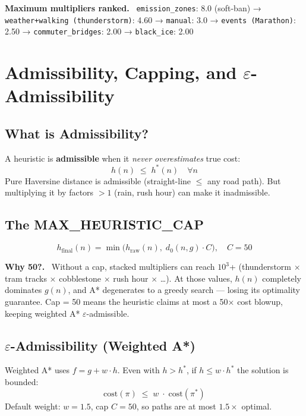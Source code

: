 \documentclass[11pt,a4paper]{article}
\newenvironment{notebox}[1][Note]{%
  \begin{mdframed}[backgroundcolor=notebox,linecolor=blue!40,linewidth=1pt]%
  \textbf{#1.}\ }{\end{mdframed}}
\newenvironment{warnbox}[1][Key Point]{%
  \begin{mdframed}[backgroundcolor=warnbox,linecolor=orange!60,linewidth=1pt]%
  \textbf{#1.}\ }{\end{mdframed}}
\begin{document}
\begin{warnbox}[Maximum multipliers ranked]
\texttt{emission\_zones}: 8.0 (soft-ban) → \texttt{weather+walking (thunderstorm)}: 4.60 → \texttt{manual}: 3.0 → \texttt{events (Marathon)}: 2.50 → \texttt{commuter\_bridges}: 2.00 → \texttt{black\_ice}: 2.00
\end{warnbox}

\section{Admissibility, Capping, and $\varepsilon$-Admissibility}

\subsection{What is Admissibility?}
A heuristic is \textbf{admissible} when it \textit{never overestimates} true cost:
\[
h(n) \;\le\; h^*(n) \quad \forall n
\]
Pure Haversine distance is admissible (straight-line $\le$ any road path). But multiplying it by
factors $>1$ (rain, rush hour) can make it inadmissible.

\subsection{The MAX\_HEURISTIC\_CAP}
\[
h_{\text{final}}(n) = \min\!\bigl(h_{\text{raw}}(n),\; d_0(n,g)\cdot C\bigr), \quad C = 50
\]

\begin{notebox}[Why 50?]
Without a cap, stacked multipliers can reach $10^3$+ (thunderstorm $\times$ tram tracks $\times$ cobblestone $\times$ rush hour $\times$ \ldots). At those values, $h(n)$ completely dominates $g(n)$, and A* degenerates to a greedy search — losing its optimality guarantee. Cap = 50 means the heuristic claims at most a 50× cost blowup, keeping weighted A* $\varepsilon$-admissible.
\end{notebox}

\subsection{$\varepsilon$-Admissibility (Weighted A*)}
Weighted A* uses $f = g + w\cdot h$. Even with $h > h^*$, if $h \le w\cdot h^*$ the solution is bounded:
\[
\text{cost}(\pi) \;\le\; w \;\cdot\; \text{cost}(\pi^*)
\]
Default weight: $w=1.5$, cap $C=50$, so paths are at most $1.5\times$ optimal.
\end{document}
